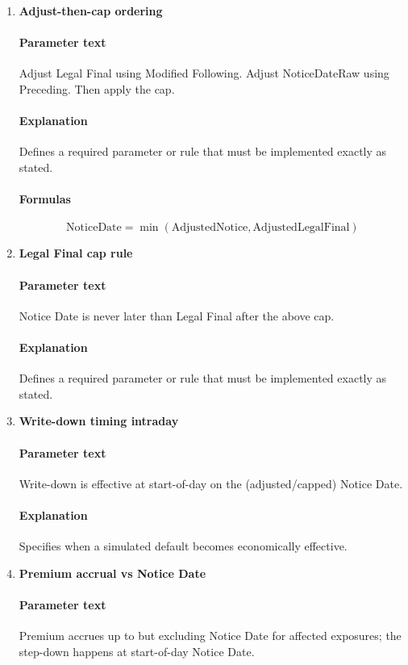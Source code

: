\documentclass[11pt]{article}
\begin{document}
\begin{enumerate}[label=\arabic*),leftmargin=*,align=left]
\item \textbf{Adjust-then-cap ordering}
\paragraph{Parameter text} Adjust Legal Final using Modified Following. Adjust NoticeDateRaw using Preceding. Then apply the cap.
\paragraph{Explanation} Defines a required parameter or rule that must be implemented exactly as stated.
\paragraph{Formulas} 
\[ \text{NoticeDate} = \min(\text{AdjustedNotice}, \text{AdjustedLegalFinal}) \]

\item \textbf{Legal Final cap rule}
\paragraph{Parameter text} Notice Date is never later than Legal Final after the above cap.
\paragraph{Explanation} Defines a required parameter or rule that must be implemented exactly as stated.

\item \textbf{Write-down timing intraday}
\paragraph{Parameter text} Write-down is effective at start-of-day on the (adjusted/capped) Notice Date.
\paragraph{Explanation} Specifies when a simulated default becomes economically effective.

\item \textbf{Premium accrual vs Notice Date}
\paragraph{Parameter text} Premium accrues up to but excluding Notice Date for affected exposures; the step-down happens at start-of-day Notice Date.

\end{enumerate}
\end{document}
